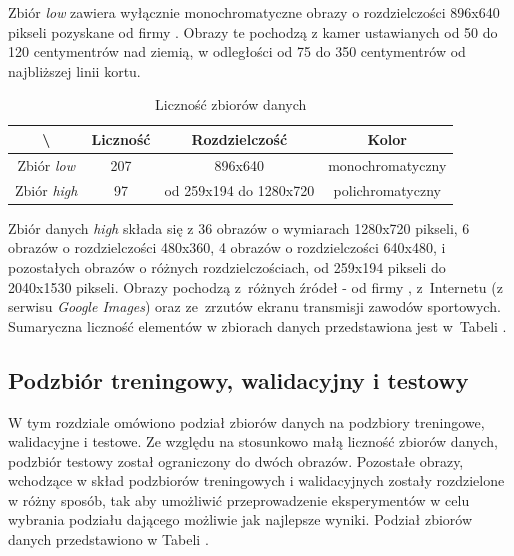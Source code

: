Zbiór \textit{low} zawiera wyłącznie monochromatyczne obrazy o rozdzielczości 896x640 pikseli pozyskane od firmy \blue{}. Obrazy te pochodzą z kamer ustawianych od 50 do 120 centymentrów nad ziemią, w odległości od 75 do 350 centymentrów od najbliższej linii kortu.

\begin{table}[!h]
	\centering
	\caption{Liczność zbiorów danych}
	\vspace{6pt}
	{\footnotesize
		\begin{tabular}{|c|c|c|c|}
			\hline \textbackslash & Liczność & Rozdzielczość & Kolor \\
      \hline Zbiór \textit{low} & 207 & 896x640 & monochromatyczny \\
      \hline Zbiór \textit{high} & 97 & od 259x194 do 1280x720 & polichromatyczny \\
      \hline
    \end{tabular}
    \label{Tab:licznosc}
	}
	\vspace{0pt}
\end{table}

Zbiór danych \textit{high} składa się z 36 obrazów o wymiarach 1280x720 pikseli, 6 obrazów o rozdzielczości 480x360, 4 obrazów o rozdzielczości 640x480, i pozostałych obrazów o różnych rozdzielczościach, od 259x194 pikseli do 2040x1530 pikseli. Obrazy pochodzą z~różnych źródeł - od firmy \blue{}, z~Internetu (z serwisu \textit{Google Images}) oraz ze~zrzutów ekranu transmisji zawodów sportowych. Sumaryczna liczność elementów w zbiorach danych przedstawiona jest w~Tabeli .

\subsection{Podzbiór treningowy, walidacyjny i testowy}
\label{sec:podzial}
W tym rozdziale omówiono podział zbiorów danych na podzbiory treningowe, walidacyjne i testowe.
Ze względu na stosunkowo małą liczność zbiorów danych, podzbiór testowy został ograniczony do dwóch obrazów.
Pozostałe obrazy, wchodzące w skład podzbiorów treningowych i walidacyjnych zostały rozdzielone w różny sposób, tak aby umożliwić przeprowadzenie eksperymentów w celu wybrania podziału dającego możliwie jak najlepsze wyniki.
Podział zbiorów danych przedstawiono w Tabeli .

